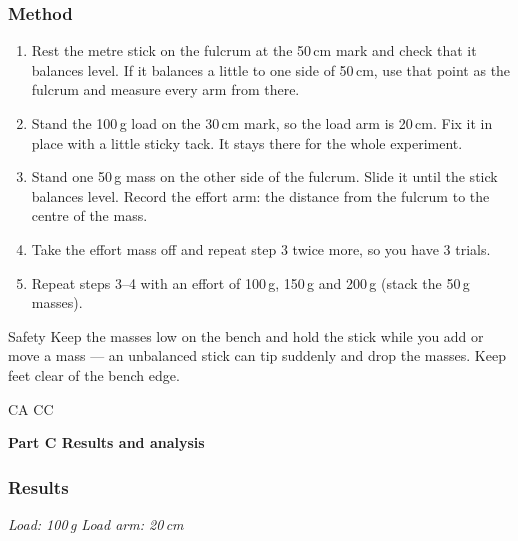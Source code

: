 \documentclass[11pt,a4paper]{article}
\newcommand{\lessonpart}[3]{%
  \par\if#1A\needspace{10\baselineskip}\vspace{10pt}\else
    \if#1C\notesfill\fi\clearpage\fi
  \begin{tcolorbox}[enhanced, breakable=false, arc=2mm, boxrule=0pt,
    colback=#3!14, borderline west={4pt}{0pt}{#3},
    left=4mm, right=3mm, top=1.6mm, bottom=1.6mm]
  {\headingfont\bfseries\color{#3!60!black}\large Part #1 \textbullet{} #2}
  \end{tcolorbox}\vspace{2pt}}
\def\anslabel{}\def\anspart{}
\newcommand{\anslabelset}[1]{\xdef\anslabel{#1}\gdef\anspart{}}
\newcommand{\notesfill}{\par
  \ifdim\dimexpr\pagegoal-\pagetotal\relax>3.2cm
    \vspace*{\fill}%
    \begin{tcolorbox}[enhanced, breakable=false, arc=2mm, colback=Paper, colframe=Line,
      left=2mm, right=2mm, top=1mm, bottom=1mm, boxrule=1pt,
      height=\dimexpr\pagegoal-\pagetotal-1.0cm\relax]
      {\small\headingfont\color{DarkGrey}Notes}
    \end{tcolorbox}%
  \fi}
\begin{document}
\subsubsection*{Method}
\begin{enumerate}[itemsep=2pt]
  \item Rest the metre stick on the fulcrum at the 50\,cm mark and check that it balances level. If it balances a little to one side of 50\,cm, use that point as the fulcrum and measure every arm from there.
  \item Stand the 100\,g load on the 30\,cm mark, so the load arm is 20\,cm. Fix it in place with a little sticky tack. It stays there for the whole experiment.
  \item Stand one 50\,g mass on the other side of the fulcrum. Slide it until the stick balances level. Record the effort arm: the distance from the fulcrum to the centre of the mass.
  \item Take the effort mass off and repeat step 3 twice more, so you have 3 trials.
  \item Repeat steps 3--4 with an effort of 100\,g, 150\,g and 200\,g (stack the 50\,g masses).
\end{enumerate}

\begin{infobox}{Safety}
Keep the masses low on the bench and hold the stick while you add or move a mass --- an unbalanced stick can tip suddenly and drop the masses. Keep feet clear of the bench edge.
\end{infobox}

\lessonpart{C}{Results and analysis}{Amber}\label{prac:10}

\subsubsection*{Results}\anslabelset{Results}
\textit{Load: 100\,g \qquad Load arm: 20\,cm}
\end{document}
